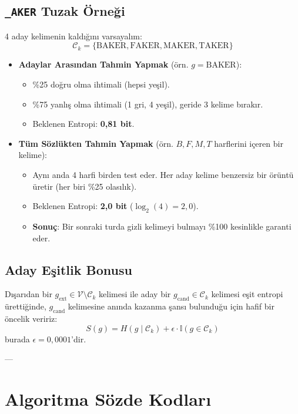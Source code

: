 \documentclass[11pt,a4paper]{article}
\begin{document}
\subsection{\texttt{\_AKER} Tuzak Örneği}
4 aday kelimenin kaldığını varsayalım:
$$\mathcal{C}_k = \{ \text{BAKER}, \text{FAKER}, \text{MAKER}, \text{TAKER} \}$$

\begin{itemize}
    \item \textbf{Adaylar Arasından Tahmin Yapmak} (örn. $g = \text{BAKER}$):
    \begin{itemize}
        \item \%25 doğru olma ihtimali (hepsi yeşil).
        \item \%75 yanlış olma ihtimali (1 gri, 4 yeşil), geride 3 kelime bırakır.
        \item Beklenen Entropi: \textbf{0,81 bit}.
    \end{itemize}
    \item \textbf{Tüm Sözlükten Tahmin Yapmak} (örn. $B, F, M, T$ harflerini içeren bir kelime):
    \begin{itemize}
        \item Aynı anda 4 harfi birden test eder. Her aday kelime benzersiz bir örüntü üretir (her biri \%25 olasılık).
        \item Beklenen Entropi: \textbf{2,0 bit} ($\log_2(4) = 2,0$).
        \item \textbf{Sonuç}: Bir sonraki turda gizli kelimeyi bulmayı \%100 kesinlikle garanti eder.
    \end{itemize}
\end{itemize}

\subsection{Aday Eşitlik Bonusu}
Dışarıdan bir $g_{\text{ext}} \in \mathcal{V} \setminus \mathcal{C}_k$ kelimesi ile aday bir $g_{\text{cand}} \in \mathcal{C}_k$ kelimesi eşit entropi ürettiğinde, $g_{\text{cand}}$ kelimesine anında kazanma şansı bulunduğu için hafif bir öncelik veririz:
\begin{equation}
S(g) = H(g \mid \mathcal{C}_k) + \epsilon \cdot \mathbb{I}(g \in \mathcal{C}_k)
\end{equation}
burada $\epsilon = 0,0001$'dir.

---

\section{Algoritma Sözde Kodları}
\end{document}
